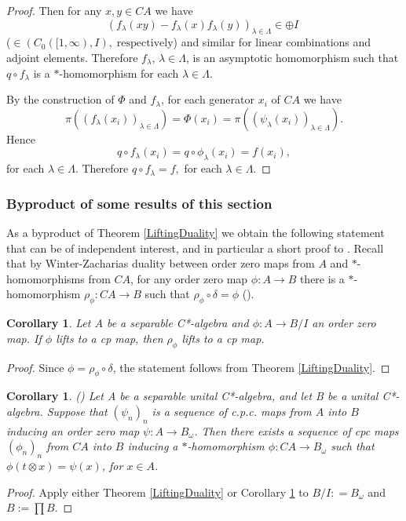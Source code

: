 \documentclass{article}%
\newtheorem{corollary}[theorem]{Corollary}
\begin{document}
\begin{proof}
  Then for any $x, y\in CA$ we have
 $$\left(f_{\lambda}(xy) - f_{\lambda}(x)f_{\lambda}(y)\right)_{\lambda\in \Lambda}\in \oplus I  \; $$
  ($\in (C_0([1, \infty), I), \;\text{respectively}$) and similar for linear combinations and adjoint elements. Therefore
 $f_{\lambda}$, $\lambda\in \Lambda$, is an asymptotic homomorphism such that
  $q\circ f_{\lambda}$ is a $\ast$-homomorphism for each $\lambda\in \Lambda$.

  By the construction of $\Phi$ and $f_{\lambda}$, for each generator $x_i$ of $CA$ we have
  $$\pi\left((f_{\lambda}(x_i))_{\lambda\in\Lambda}\right) = \Phi(x_i) = \pi\left((\psi_{\lambda}(x_i))_{\lambda\in\Lambda}\right).$$
  Hence $$q\circ f_{\lambda}(x_i) = q\circ \phi_{\lambda}(x_i) = f(x_i),$$ for each $\lambda\in \Lambda$. Therefore
  $q\circ f_{\lambda} = f, $ for each $\lambda \in \Lambda$.
  \end{proof}




\subsubsection{Byproduct of some results of this section}

As a byproduct of Theorem \ref{LiftingDuality} we obtain the following statement that can be of independent interest, and in particular a short proof to  \cite[Lemma 4.1]{BCW}. Recall that by Winter-Zacharias duality between order zero maps from $A$  and $\ast$-homomorphisms from $CA$, for any order zero map $\phi:A \to B$ there is a $\ast$-homomorphism $\rho_{\phi} : CA \to  B$ such that $\rho_{\phi}\circ \delta = \phi$ (\cite{WZ}).


\begin{corollary}\label{OrderZeroVsHomomorphism} Let $A$  be a separable C*-algebra and $\phi:A \to B/I$  an order zero map. If $\phi $ lifts to a cp map, then $\rho_{\phi}$ lifts to a cp map.
\end{corollary}
\begin{proof} Since $\phi = \rho_{\phi}\circ \delta$, the statement follows from Theorem  \ref{LiftingDuality}.
\end{proof}



\begin{corollary}\label{lemmaBCW}(\cite[Lemma 4.1]{BCW}) Let A be a separable unital C*-algebra, and let B be a unital
C*-algebra. Suppose that $(\psi_n)_{n}$ is a sequence of c.p.c. maps from $A$ into
$B$ inducing an order zero map $\psi : A \to B_{\omega}$. Then there exists a sequence of
cpc maps $(\phi_n)_n$ from $CA$ into $B$ inducing a $\ast$-homomorphism
$\phi : CA\to B_{\omega}$ such that $\phi(t\otimes x) = \psi(x)$, for $x\in A$.
\end{corollary}
\begin{proof} Apply  either Theorem \ref{LiftingDuality} or Corollary \ref{OrderZeroVsHomomorphism} to $B/I: =B_{\omega}$ and $B:= \prod B$.
\end{proof}
\end{document}
